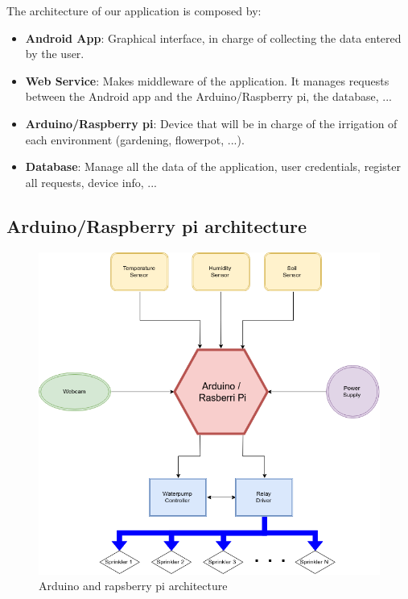 \documentclass[11pt,a4paper]{article}
\begin{document}
The architecture of our application is composed by:
\begin{itemize}
\item \textbf{Android App}: Graphical interface, in charge of collecting the data entered by the user.
\item \textbf{Web Service}: Makes middleware of the application. It manages requests between the Android app and the Arduino/Raspberry pi, the database, ...
\item \textbf{Arduino/Raspberry pi}: Device that will be in charge of the irrigation of each environment (gardening, flowerpot, ...).
\item \textbf{Database}: Manage all the data of the application, user credentials, register all requests, device info, ...
\end{itemize}

\newpage

\subsection{Arduino/Raspberry pi architecture}
\vspace*{3cm}
\begin{figure}[hbtp]
\centering
\includegraphics[scale=0.6]{ArduinoArch.png}
\caption{Arduino and rapsberry pi architecture}
\end{figure}
\end{document}

